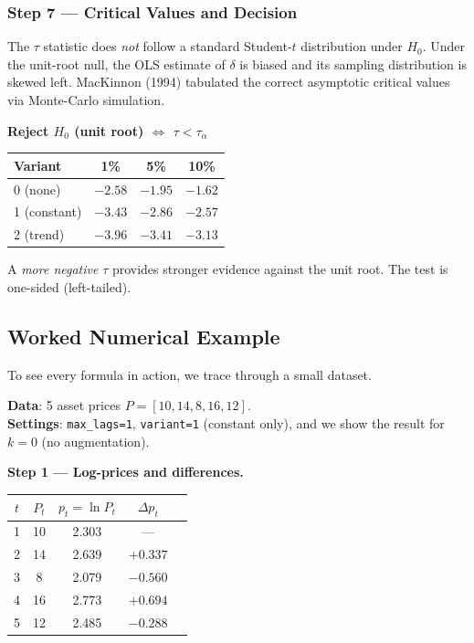 \documentclass[10pt,a4paper,twocolumn]{article}
\begin{document}
\subsubsection{Step 7 --- Critical Values and Decision}

The $\tau$ statistic does \emph{not} follow a standard Student-$t$
distribution under $H_0$.  Under the unit-root null, the OLS
estimate of $\delta$ is biased and its sampling distribution is
skewed left.  MacKinnon (1994) tabulated the correct asymptotic
critical values via Monte-Carlo simulation.

\begin{tcolorbox}[mathbox={Formula 7 --- Decision Rule}]
\begin{center}
  \textbf{Reject $H_0$ (unit root) $\Longleftrightarrow$ $\tau < \tau_\alpha$}
\end{center}
\vspace{-2pt}
\begin{center}
\small
\begin{tabular}{@{}lccc@{}}
\toprule
Variant & 1\% & 5\% & 10\%\\\midrule
0 (none)     & $-2.58$ & $-1.95$ & $-1.62$\\
1 (constant) & $-3.43$ & $-2.86$ & $-2.57$\\
2 (trend)    & $-3.96$ & $-3.41$ & $-3.13$\\
\bottomrule
\end{tabular}
\end{center}
\vspace{-2pt}
A \emph{more negative} $\tau$ provides stronger evidence against the
unit root.  The test is one-sided (left-tailed).
\end{tcolorbox}

\subsection{Worked Numerical Example}

To see every formula in action, we trace through a small dataset.

\begin{tcolorbox}[exbox={Setup}]
\textbf{Data}: 5 asset prices $P = [10, 14, 8, 16, 12]$.\\
\textbf{Settings}: \texttt{max\_lags=1}, \texttt{variant=1}
(constant only), and we show the result for $k=0$ (no augmentation).
\end{tcolorbox}

\noindent\textbf{Step 1 --- Log-prices and differences.}
\begin{center}\small
\begin{tabular}{@{}ccccc@{}}
\toprule
$t$ & $P_t$ & $p_t=\ln P_t$ & $\Delta p_t$\\\midrule
1 & 10 & 2.303 & ---\\
2 & 14 & 2.639 & $+0.337$\\
3 &  8 & 2.079 & $-0.560$\\
4 & 16 & 2.773 & $+0.694$\\
5 & 12 & 2.485 & $-0.288$\\
\bottomrule
\end{tabular}
\end{center}
\end{document}
